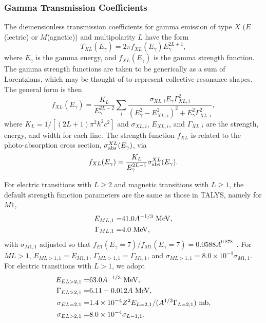 \documentclass[
10pt,
showpacs,preprintnumbers,footinbib,
amsfonts,amsmath,amssymb,
aps,
prc,twocolumn,groupedaddress,superscriptaddress,
showkeys,
nofootinbib
]{revtex4-1}
\begin{document}
\subsubsection{Gamma Transmission Coefficients}

The diemensionless transmission coefficients for gamma emission of type $X$ ($E$(lectric) or $M$(agnetic)) and multipolarity $L$ have the form
\begin{equation}
T_{XL}(E_\gamma) = 2\pi f_{XL}(E_\gamma)E_\gamma^{2L+1},
\end{equation}
where $E_\gamma$ is the gamma energy, and $f_{XL}(E_\gamma)$ is the gamma strength function. The gamma strength functions are taken to be generically as a sum of Lorentzians, which may be thought of to represent collective resonance shapes. The general form is then
\begin{equation}
f_{XL}(E_\gamma ) = \frac{K_L}{E_\gamma^{2L-2} }\sum_i \frac{\sigma_{XL,i} E_\gamma\Gamma^2_{XL,i}}{(E_\gamma^2 - E^2_{XL,i})^2+E^2_\gamma\Gamma^2_{XL,i}},
\label{eq:Lor}
\end{equation} 
where $K_L = 1/[(2L+1)\pi^2\hbar^2c^2]$ and $\sigma_{XL,i}$, $E_{XL,i}$, and $\Gamma_{XL,i}$ are the strength, energy, and width for each line.  The strength function $f_{XL}$ is related to the photo-absorption cross section, $\sigma_{\rm abs}^{XL}(E_\gamma)$, via
\begin{equation}
f_{XL}(E_\gamma) = \frac{K_L}{E_\gamma^{2L-1}}  \sigma_{\rm abs}^{XL}(E_\gamma).
\end{equation}

For electric transitions with $L \ge 2$ and magnetic transitions with $L \ge 1$, the default strength function parameters are the same as those in TALYS, namely for $M1$,
\begin{align}
E_{ML,1} =  & 41.0A^{-1/3}~{\rm MeV}, \notag \\
\Gamma_{ML,1} = & 4.0~{\rm MeV},
\end{align}
with $\sigma_{M1,1}$ adjusted so that $f_{E1}(E_\gamma = 7)/f_{M1}(E_\gamma = 7) = 0.0588A^{0.878}$~\cite{RIPL-3}. For $ML>1$, $E_{ML>1,1} = E_{M1,1}$, $\Gamma_{ML>1,1} = \Gamma_{M1,1}$, and $\sigma_{ML>1,1} = 8.0\times 10^{-4}\sigma_{M1,1}$.
 For electric transitions with $L > 1$, we adopt
\begin{align}
E_{EL>2,1} =  & 63.0A^{-1/3}~{\rm MeV},\notag\\
\Gamma_{EL>2,1} = & 6.11 - 0.012A~{\rm MeV},\notag\\
\sigma_{EL=2,1}= & 1.4\times 10^{-4}Z^2E_{L=2,1}/(A^{1/3}\Gamma_{L=2,1})~{\rm mb},\notag\\
\sigma_{EL>2,1}= & 8.0\times 10^{-4}\sigma_{L-1,1}.
\end{align}
\end{document}
